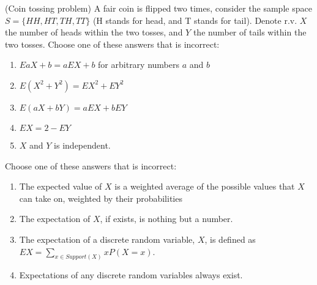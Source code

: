 \documentclass[poll_tutorial_format]{subfiles}
\begin{document}
	
		
	\begin{exercise}
		(Coin tossing problem) A fair coin is flipped two times, consider the sample space $S=\{HH, HT, TH, TT\}$ (H stands for head, and T stands for tail). Denote r.v. $X$ the number of heads within the two tosses, and $Y$ the number of tails within the two tosses.
		Choose one of these answers that is incorrect: %
		\begin{enumerate}
			\item $EaX+b=aEX+b$ for arbitrary numbers $a$ and $b$ 
			\item $E(X^2 +Y^2)=EX^2 +EY^2$
			\item $E(aX+bY)=aEX +bEY$
			\item $EX=2-EY$ 		
			\item $X$ and $Y$ is independent.
		\end{enumerate}
	\end{exercise}
	
	
	\begin{exercise}
		Choose one of these answers that is incorrect: %
		\begin{enumerate}
			\item The expected value of $X$ is a weighted average of the possible values that $X$ can take on, weighted by their probabilities
			\item The expectation of $X$, if exists, is nothing but a number.
			\item  The expectation of a discrete random variable, $X$, is defined as $EX=\sum_{x\in \textit{Support}(X)} xP(X=x)$.
			\item Expectations of any discrete random variables always exist.  
		\end{enumerate}
	\end{exercise}
	
	
	
\end{document}
